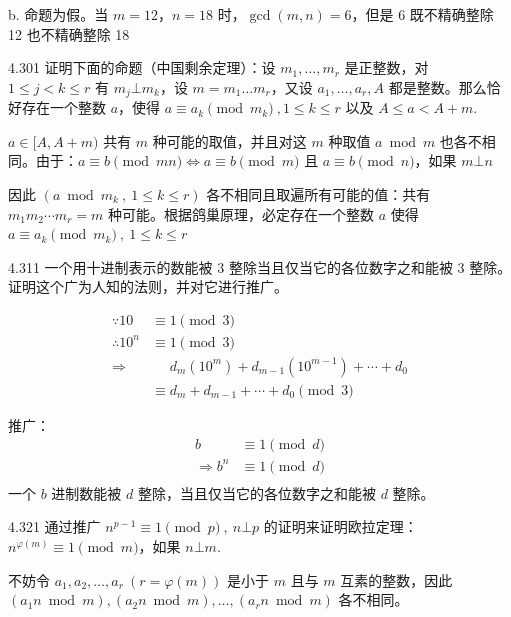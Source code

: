 b. 命题为假。当 \( m = 12 \)，\( n = 18 \) 时，\( \gcd(m,n) = 6 \)，但是 6 既不精确整除 12 也不精确整除 18

\begin{problem}{4.30}{1}
  证明下面的命题（中国剩余定理）：设 \( m_1, \dots , m_r \) 是正整数，对 \( 1 \le j < k \le r \) 有 \( m_j \bot m_k \)，设 \( m = m_1 \dots m_r \)，又设 \( a_1, \dots , a_r, A \) 都是整数。那么恰好存在一个整数 \( a \)，使得 \( a \equiv a_k \pmod{m_k} \ , 1 \le k \le r \) 以及 \( A \le a < A+m \).
\end{problem}

\( a \in [A , A+m) \) 共有 \( m \) 种可能的取值，并且对这 \( m \) 种取值 \( a \bmod m \) 也各不相同。由于：\( a \equiv b \pmod{mn} \Leftrightarrow a \equiv b \pmod{m} \) 且 \( a \equiv b \pmod{n} \)，如果 \( m \bot n \)

因此 \( (a \bmod m_k \ , \ 1 \le k \le r) \) 各不相同且取遍所有可能的值：共有 \( m_1 m_2 \cdots m_r = m \) 种可能。根据鸽巢原理，必定存在一个整数 \( a \) 使得 \( a \equiv a_k \pmod{m_k} \ , \ 1 \le k \le r \)

\begin{problem}{4.31}{1}
  一个用十进制表示的数能被 3 整除当且仅当它的各位数字之和能被 3 整除。证明这个广为人知的法则，并对它进行推广。
\end{problem}

\begin{align*}
  \because 10 & \equiv 1 \pmod{3} \\
  \therefore 10^n & \equiv 1 \pmod{3} \\
  \Rightarrow &\phantom{\equiv} d_m (10^m) + d_{m-1} (10^{m-1}) + \cdots + d_0 \\
  &\equiv d_m + d_{m-1} + \cdots + d_0 \pmod{3}
\end{align*}

推广：
\begin{align*}
  b &\equiv 1 \pmod{d} \\
  \Rightarrow b^n &\equiv 1 \pmod{d} \\
\end{align*}
一个 \( b \) 进制数能被 \( d \) 整除，当且仅当它的各位数字之和能被 \( d \) 整除。

\begin{problem}{4.32}{1}
  通过推广 \( n^{p-1} \equiv 1 \pmod{p} \ , \ n \bot p \) 的证明来证明欧拉定理：\( n^{\varphi(m)} \equiv 1 \pmod{m} \)，如果 \( n \bot m \).
\end{problem}

不妨令 \( a_1, a_2, \dots , a_r \ (r = \varphi(m)) \) 是小于 \( m \) 且与 \( m \) 互素的整数，因此 \( (a_1 n \bmod m) , (a_2 n \bmod m) , \dots , (a_r n \bmod m) \) 各不相同。

